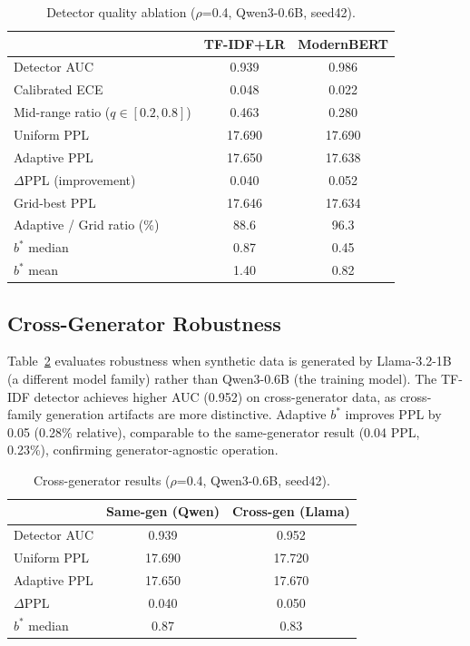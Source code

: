 \documentclass[11pt]{article}
\begin{document}
\begin{table}[t]
\centering
\caption{Detector quality ablation ($\rho$=0.4, Qwen3-0.6B, seed42).}
\label{tab:detector}
\small
\begin{tabular}{l cc}
\toprule
& TF-IDF+LR & ModernBERT \\
\midrule
Detector AUC & 0.939 & 0.986 \\
Calibrated ECE & 0.048 & 0.022 \\
Mid-range ratio ($q \in [0.2, 0.8]$) & 0.463 & 0.280 \\
\midrule
Uniform PPL & 17.690 & 17.690 \\
Adaptive PPL & 17.650 & 17.638 \\
$\Delta$PPL (improvement) & 0.040 & 0.052 \\
Grid-best PPL & 17.646 & 17.634 \\
Adaptive / Grid ratio (\%) & 88.6 & 96.3 \\
\midrule
$b^*$ median & 0.87 & 0.45 \\
$b^*$ mean & 1.40 & 0.82 \\
\bottomrule
\end{tabular}
\end{table}

\subsection{Cross-Generator Robustness}
\label{sec:cross_gen}

Table~\ref{tab:cross_gen} evaluates robustness when synthetic data is generated by Llama-3.2-1B (a different model family) rather than Qwen3-0.6B (the training model). The TF-IDF detector achieves higher AUC (0.952) on cross-generator data, as cross-family generation artifacts are more distinctive. Adaptive $b^*$ improves PPL by 0.05 (0.28\% relative), comparable to the same-generator result (0.04 PPL, 0.23\%), confirming generator-agnostic operation.

\begin{table}[t]
\centering
\caption{Cross-generator results ($\rho$=0.4, Qwen3-0.6B, seed42).}
\label{tab:cross_gen}
\small
\begin{tabular}{l cc}
\toprule
& Same-gen (Qwen) & Cross-gen (Llama) \\
\midrule
Detector AUC & 0.939 & 0.952 \\
Uniform PPL & 17.690 & 17.720 \\
Adaptive PPL & 17.650 & 17.670 \\
$\Delta$PPL & 0.040 & 0.050 \\
$b^*$ median & 0.87 & 0.83 \\
\bottomrule
\end{tabular}
\end{table}
\end{document}
